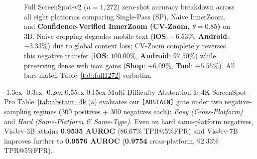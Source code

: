 \documentclass[10pt,twocolumn,letterpaper]{article}
\makeatletter
\renewcommand\subsection{\@startsection{subsection}{2}{\z@}%
  {-1.3ex \@plus -0.3ex \@minus -0.2ex}%
  {0.55ex \@plus 0.15ex}%
  {\normalfont\normalsize\bfseries\color{navy!85!black}}}
\makeatother
\begin{document}
\begin{figure}[t]
{%
}
\caption{Full ScreenSpot-v2 ($n{=}1{,}272$) zero-shot accuracy breakdown across all eight platforms comparing Single-Pass (SP), Naive InnerZoom, and \textbf{Confidence-Verified InnerZoom (CV-Zoom, $\theta{=}0.85$)} on 3B. Naive cropping degrades mobile text (\textbf{iOS}: $-6.53\%$, \textbf{Android}: $-3.33\%$) due to global context loss; CV-Zoom completely reverses this negative transfer (\textbf{iOS}: $100.00\%$, \textbf{Android}: $97.50\%$) while preserving dense web icon gains (\textbf{Shop}: $+6.09\%$, \textbf{Tool}: $+5.55\%$). All bars match Table~\ref{tab:full1272} verbatim.}
\label{fig:platforms}
\end{figure}

\subsection{Multi-Difficulty Abstention \& 4K ScreenSpot-Pro}
Table~\ref{tab:abstain_4k}(a) evaluates our \texttt{[ABSTAIN]} gate under two negative-sampling regimes ($300$ positives + $300$ negatives each): \emph{Easy (Cross-Platform)} and \emph{Hard (Same-Platform \& Same-Type)}. Even on hard same-platform negatives, VisJev-3B attains \textbf{0.9535 AUROC} ($86.67\%$ TPR@5\%FPR) and VisJev-7B improves further to \textbf{0.9576 AUROC} (\textbf{0.9754} cross-platform, $92.33\%$ TPR@5\%FPR).
\end{document}
